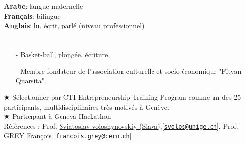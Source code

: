 \documentclass[a4paper,10pt]{article}
\begin{document}


\begin{minipage}[t]{0.45\textwidth}
\section{\Large{\selectfont{Langues}}}
\textbf{Arabe}: langue maternelle \\
\hspace{1cm}\textbf{Français}: bilingue\\
\hspace{1cm}\textbf{Anglais}: lu, \'ecrit, parl\'e (niveau professionnel)
\end{minipage}
\hfill
\begin{minipage}[t]{0.45\textwidth}
\section{\Large\selectfont{Activit\'es et loisirs}} 
\begin{itemize}
\item[\--] Basket-ball, plong\'ee, \'ecriture.
\item[\--] Membre fondateur de l'association culturelle et socio-\'economique "Fityan Quarsita".
\end{itemize}

\end{minipage}
$\bigstar $ S\'electionner par CTI Entrepreneurship Training Program comme un des 25 participants, multidisciplinaires tr\`es motiv\'es \`a Gen\`eve.\\
$\bigstar $ Participant \`a Geneva Hackathon\\
R\'ef\'erences : Prof. \href{http://sip.unige.ch/team/prof-sviatoslav-voloshynovskiy/}{Sviatoslav voloshynovskiy (Slava)},[\href{mailto:svolos@unige.ch}{\nolinkurl{svolos@unige.ch}}], Prof. \href{https://itp.nyu.edu/itp/people/people.php?id=3273&group=All}{GREY François} [\href{mailto:francois.grey@cern.ch }{\nolinkurl{francois.grey@cern.ch}}]




\end{document}
